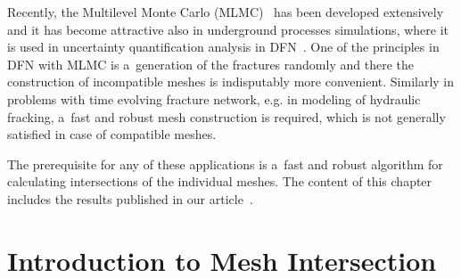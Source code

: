 Recently, the Multilevel Monte Carlo (MLMC)~\cite{giles_mlmc_2015} has been developed extensively and it has become attractive also
in underground processes simulations, where it is used in uncertainty quantification analysis in DFN~\cite{berrone_uncertainty_2015, berrone_uncertainty_2018}.
One of the principles in DFN with MLMC is a~generation of the fractures randomly and there the construction of 
incompatible meshes is indisputably more convenient.
Similarly in problems with time evolving fracture network, e.g. in modeling of hydraulic fracking,
a~fast and robust mesh construction is required, which is not generally satisfied in case of compatible meshes.

The prerequisite for any of these applications is a~fast and robust algorithm for calculating intersections of the individual meshes.
The content of this chapter includes the results published in our article~\cite{brezina_2017}.



\section{Introduction to Mesh Intersection}

